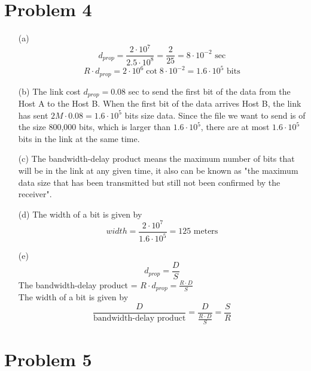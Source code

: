 \documentclass[12pt,a4paper]{article}
\begin{document}
\section*{Problem 4}

\begin{enumerate}
    \item [(a)] 
        \[
            d_{prop} = \frac{2\cdot 10^{7}}{2.5\cdot 10^{8}} = \frac{2}{25} = 8\cdot 10^{-2} \text{ sec}
        \]
        \[
            R\cdot d_{prop} = 2\cdot 10^{6} \cot 8\cdot 10^{-2} = 1.6\cdot 10^{5} \text{ bits}
        \]
    \item[(b)]
        The link cost $d_{prop} = 0.08$ sec to send the first bit of the data from the Host A to the Host B.
        When the first bit of the data arrives Host B, the link has sent $2M\cdot 0.08 = 1.6\cdot 10^{5}$ bits size data.
        Since the file we want to send is of the size 800,000 bits, which is larger than $1.6\cdot 10^{5}$, there are at most $1.6\cdot 10^{5}$ bits in the link at the same time.
    \item[(c)]
        The bandwidth-delay product means the maximum number of bits that will be in the link at any given time, it also can be known as "the maximum data size that has been transmitted but still not been confirmed by the receiver".
    \item[(d)]
        The width of a bit is given by
        \[
            width = \frac{2\cdot 10^{7}}{1.6\cdot 10^{5}} = 125 \text{ meters}
        \]
    \item[(e)]
        \[
            d_{prop} = \frac{D}{S}
        \]
        The bandwidth-delay product = $R\cdot d_{prop} = \frac{R\cdot D}{S}$
        \\
        The width of a bit is given by
        \[
            \frac{D}{\text{bandwidth-delay product}} = \frac{D}{\frac{R\cdot D}{S}} = \frac{S}{R}
        \]
\end{enumerate}

\section*{Problem 5}
\end{document}
